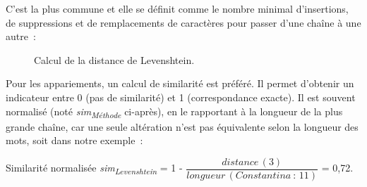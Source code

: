 \documentclass[a4paper,12pt,twoside]{book}
\begin{document}
                C'est la plus commune et elle se définit comme le nombre minimal d'insertions, de suppressions et de remplacements de caractères pour passer d'une chaîne à une autre~:
                
                    \begin{figure}[!ht]
                    \centering
                    \label{fig4}
                    \caption{Calcul de la distance de Levenshtein.}
                \end{figure}
                
                Pour les appariements, un calcul de similarité est préféré. Il permet d'obtenir un indicateur entre 0 (pas de similarité) et 1 (correspondance exacte). Il est souvent normalisé (noté \textit{sim\textsubscript{Méthode}} ci-après), en le rapportant à la longueur de la plus grande chaîne, car une seule altération n'est pas équivalente selon la longueur des mots, soit dans notre exemple~:
                \bigskip
                
                Similarité normalisée \textit{sim\textsubscript{Levenshtein}}  = 1 - $ \dfrac{distance\,(3)}{longueur\,(Constantina~:\,11)} $ = 0,72.\\
                
\end{document}
